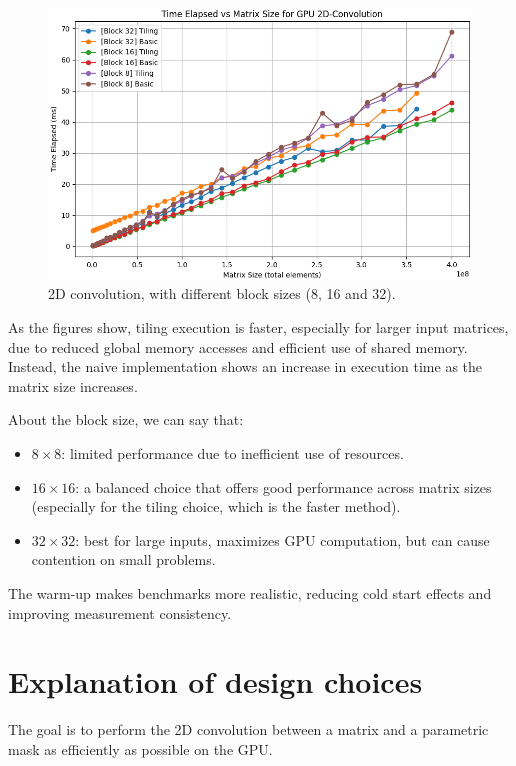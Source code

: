 \documentclass[a4paper]{article}
\newcommand{\highspace}{\vspace{1.2em}\noindent}
\begin{document}
    \newpage

    \begin{figure}[!htp]
        \centering
        \includegraphics[width=.8\textwidth]{all-compare-cropped.png}
        \caption{2D convolution, with different block sizes (8, 16 and 32).}
    \end{figure}

    \noindent
    As the figures show, tiling execution is faster, especially for larger input matrices, due to reduced global memory accesses and efficient use of shared memory. Instead, the naive implementation shows an increase in execution time as the matrix size increases.

    \highspace
    About the block size, we can say that:
    \begin{itemize}
        \item $8 \times 8$: limited performance due to inefficient use of resources.

        \item $16 \times 16$: a balanced choice that offers good performance across matrix sizes (especially for the tiling choice, which is the faster method).
        
        \item $32 \times 32$: best for large inputs, maximizes GPU computation, but can cause contention on small problems.
    \end{itemize}
    The warm-up makes benchmarks more realistic, reducing cold start effects and improving measurement consistency.

    \section{Explanation of design choices}
    The goal is to perform the 2D convolution between a matrix and a parametric mask as efficiently as possible on the GPU.
    
\end{document}
